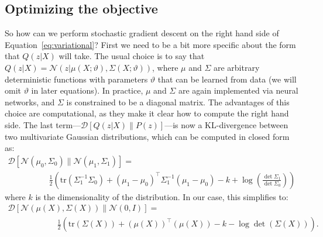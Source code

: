 \documentclass[a4paper, 11pt]{article} %
\begin{document}
\subsection{Optimizing the objective}

So how can we perform stochastic gradient descent on the right hand side of Equation~\ref{eq:variational}?
First we need to be a bit more specific about the form that $Q(z|X)$ will take.  
The usual choice is to say that $Q(z|X)=\mathcal{N}(z|\mu(X;\vartheta),\Sigma(X;\vartheta))$, where $\mu$ and $\Sigma$ are arbitrary deterministic functions with parameters $\vartheta$ that can be learned from data (we will omit $\vartheta$ in later equations).
In practice, $\mu$ and $\Sigma$ are again implemented via neural networks, and $\Sigma$ is constrained to be a diagonal matrix.
The advantages of this choice are computational, as they make it clear how to compute the right hand side.
The last term---$\mathcal{D}\left[Q(z|X)\|P(z)\right]$---is now a KL-divergence between two multivariate Gaussian distributions, which can be computed in closed form as:
\begin{equation}
\begin{array}{c}
 \mathcal{D}[\mathcal{N}(\mu_0,\Sigma_0) \| \mathcal{N}(\mu_1,\Sigma_1)] = \hspace{20em}\\
  \hspace{5em}\frac{ 1 }{ 2 } \left( \mathrm{tr} \left( \Sigma_1^{-1} \Sigma_0 \right) + \left( \mu_1 - \mu_0\right)^\top \Sigma_1^{-1} ( \mu_1 - \mu_0 ) - k + \log \left( \frac{ \det \Sigma_1 }{ \det \Sigma_0  } \right)  \right)
\end{array}
\end{equation}
\noindent where $k$ is the dimensionality of the distribution.  In our case, this simplifies to:
\begin{equation}
\begin{array}{c}
 \mathcal{D}[\mathcal{N}(\mu(X),\Sigma(X)) \| \mathcal{N}(0,I)] = \hspace{20em}\\
\hspace{6em}\frac{ 1 }{ 2 } \left( \mathrm{tr} \left( \Sigma(X) \right) + \left( \mu(X)\right)^\top ( \mu(X) ) - k - \log\det\left(  \Sigma(X)  \right)  \right).
\end{array}
\end{equation}
\end{document}
